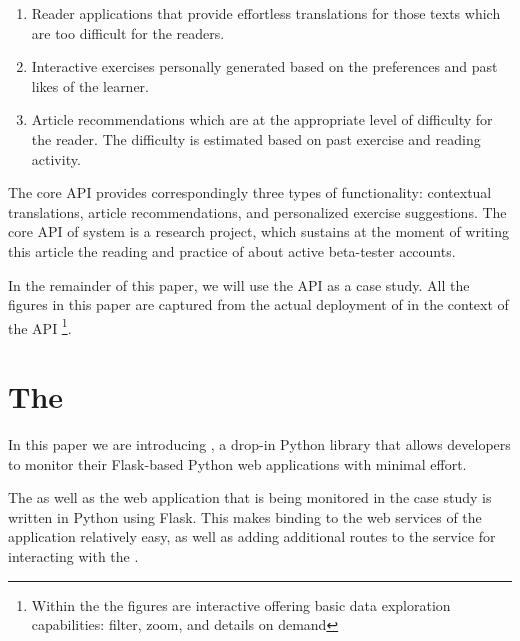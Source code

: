 \documentclass[conference]{IEEEtran}
\begin{document}
  \begin{enumerate}

    \item Reader applications that provide effortless translations for those texts which are too difficult for the readers.

    \item Interactive exercises personally generated based on the preferences and past likes of the learner.

    \item Article recommendations which are at the appropriate level of difficulty for the reader. The difficulty is estimated based on past exercise and reading activity.

  \end{enumerate}

  The core API provides correspondingly three types of functionality: contextual translations, article recommendations, and personalized exercise suggestions. The core API of system is a research project, which sustains at the moment of writing this article the reading and practice of about \activeUserCount active beta-tester accounts. 

  In the remainder of this paper, we will use the \zee API as a case study. All the figures in this paper are captured from the actual deployment of \tool in the context of the \zee API \footnote{Within the \tool the figures are interactive offering basic data exploration capabilities: filter, zoom, and details on demand\cite{Shne99a}}.





\section{The \tool}
  In this paper we are introducing \tool, a drop-in Python library that allows developers to monitor their Flask-based Python web applications with minimal effort.

  The \tool as well as the web application that is being monitored in the case study is written in Python using Flask. This makes binding to the web services of the application relatively easy, as well as adding additional routes to the service for interacting with the \tool.
\end{document}
